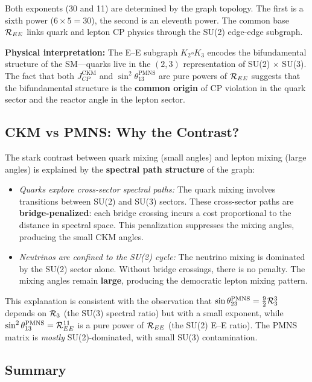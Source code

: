Both exponents (30 and 11) are determined by the graph topology. The first is a sixth power ($6 \times 5 = 30$), the second is an eleventh power. The common base $\mathcal{R}_{EE}$ links quark and lepton CP physics through the SU(2) edge-edge subgraph.

\textbf{Physical interpretation:} The E--E subgraph $K_2 \square K_3$ encodes the bifundamental structure of the SM---quarks live in the $(2, 3)$ representation of SU(2) $\times$ SU(3). The fact that both $J_{CP}^{\mathrm{CKM}}$ and $\sin^2\theta_{13}^{\mathrm{PMNS}}$ are pure powers of $\mathcal{R}_{EE}$ suggests that the bifundamental structure is the \textbf{common origin} of CP violation in the quark sector and the reactor angle in the lepton sector.

\subsection{CKM vs PMNS: Why the Contrast?}\label{sec:ckm_vs_pmns}

The stark contrast between quark mixing (small angles) and lepton mixing (large angles) is explained by the \textbf{spectral path structure} of the graph:

\begin{itemize}
\item \textit{Quarks explore cross-sector spectral paths:} The quark mixing involves transitions between SU(2) and SU(3) sectors. These cross-sector paths are \textbf{bridge-penalized}: each bridge crossing incurs a cost proportional to the distance in spectral space. This penalization suppresses the mixing angles, producing the small CKM angles.

\item \textit{Neutrinos are confined to the SU(2) cycle:} The neutrino mixing is dominated by the SU(2) sector alone. Without bridge crossings, there is no penalty. The mixing angles remain \textbf{large}, producing the democratic lepton mixing pattern.
\end{itemize}

This explanation is consistent with the observation that $\sin\theta_{23}^{\mathrm{PMNS}} = \frac{9}{2}\mathcal{R}_3^3$ depends on $\mathcal{R}_3$ (the SU(3) spectral ratio) but with a small exponent, while $\sin^2\theta_{13}^{\mathrm{PMNS}} = \mathcal{R}_{EE}^{11}$ is a pure power of $\mathcal{R}_{EE}$ (the SU(2) E--E ratio). The PMNS matrix is \textit{mostly} SU(2)-dominated, with small SU(3) contamination.

\subsection{Summary}\label{sec:pmns_summary}

